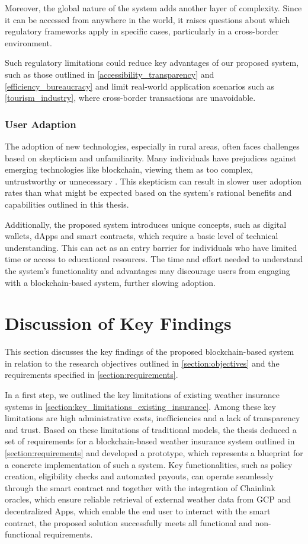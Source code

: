 Moreover, the global nature of the system adds another layer of complexity. Since it can be accessed from anywhere in the world, it raises questions about which regulatory frameworks apply in specific cases, particularly in a cross-border environment.

Such regulatory limitations could reduce key advantages of our proposed system, such as those outlined in \cref{accessibility_transparency} and \cref{efficiency_bureaucracy} and limit real-world application scenarios such as \cref{tourism_industry}, where cross-border transactions are unavoidable.

\subsubsection{User Adaption}
The adoption of new technologies, especially in rural areas, often faces challenges based on skepticism and unfamiliarity. Many individuals have prejudices against emerging technologies like blockchain, viewing them as too complex, untrustworthy or unnecessary \autocite{Alabdali2023Influential}. This skepticism can result in slower user adoption rates than what might be expected based on the system's rational benefits and capabilities outlined in this thesis.

Additionally, the proposed system introduces unique concepts, such as digital wallets, dApps and smart contracts, which require a basic level of technical understanding. This can act as an entry barrier for individuals who have limited time or access to educational resources. The time and effort needed to understand the system's functionality and advantages may discourage users from engaging with a blockchain-based system, further slowing adoption.

\section{Discussion of Key Findings}
This section discusses the key findings of the proposed blockchain-based system in relation to the research objectives outlined in \cref{section:objectives} and the requirements specified in \cref{section:requirements}.

In a first step, we outlined the key limitations of existing weather insurance systems in \cref{section:key_limitations_existing_insurance}. Among these key limitations are high administrative costs, inefficiencies and a lack of transparency and trust. Based on these limitations of traditional models, the thesis deduced a set of requirements for a blockchain-based weather insurance system outlined in \cref{section:requirements} and developed a prototype, which represents a blueprint for a concrete implementation of such a system. Key functionalities, such as policy creation, eligibility checks and automated payouts, can operate seamlessly through the smart contract and together with the integration of Chainlink oracles, which ensure reliable retrieval of external weather data from GCP and decentralized Apps, which enable the end user to interact with the smart contract, the proposed solution successfully meets all functional and non-functional requirements.

